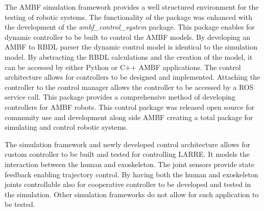 The AMBF simulation framework provides a well structured environment for the testing of robotic systems. The functionality of the package was enhanced with the development of the \textit{ambf\_control\_system} package. This package enables for dynamic controller to be built to control the AMBF models. By developing an AMBF to RBDL parser the dynamic control model is identical to the simulation model. By abstracting the RBDL calculations and the creation of the model, it can be accessed by either Python or C++ AMBF applications. The control architecture allows for controllers to be designed and implemented. Attaching the controller to the control manager allows the controller to be accessed by a ROS service call. This package provides a comprehensive method of developing controllers for AMBF robots. This control package was released open source for community use and development along side AMBF creating a total package for simulating and control robotic systems.   

The simulation framework and newly developed control architecture allows for custom controller to be built and tested for controlling LARRE. It models the interaction between the human and exoskeleton. The joint sensors provide state feedback enabling trajectory control. By having both the human and exoskeleton joints controllable also for cooperative controller to be developed and tested in the simulation. Other simulation frameworks do not allow for such application to be tested.  

